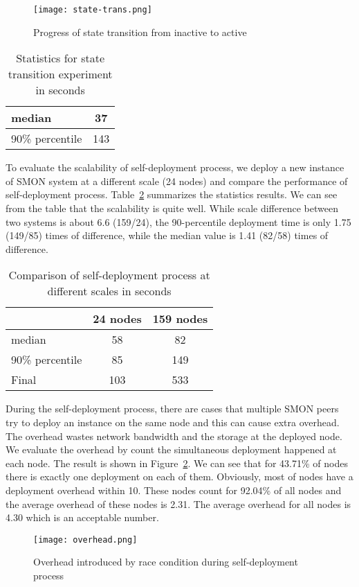 \begin{figure}
\centering
\texttt{[image: state-trans.png]}
\caption{Progress of state transition from inactive to active}
\label{fig:state-transition}
\end{figure}

\begin{table}
\centering
\begin{tabular}{|l|c|}
\hline
median & 37 \\
\hline
90\% percentile & 143 \\
\hline
\end{tabular}
\caption{Statistics for state transition experiment in seconds}
\label{tbl:state-transition}
\end{table}

To evaluate the scalability of self-deployment process, we deploy
a new instance of SMON system at a different scale (24 nodes) and
compare the performance of self-deployment process.
Table~\ref{tbl:scalability} summarizes the statistics results.
We can see from the table that the scalability is quite well.
While scale difference between two systems is about 6.6 (159/24), the
90-percentile deployment time is only 1.75 (149/85) times of
difference, while the median value is 1.41 (82/58) times of
difference.

\begin{table}
\centering
\begin{tabular}{|l|c|c|}
\hline
  & 24 nodes & 159 nodes\\
\hline
median & 58 & 82 \\
\hline
90\% percentile & 85 & 149 \\
\hline
Final & 103 & 533 \\
\hline
\end{tabular}
\caption{Comparison of self-deployment process at different scales in seconds}
\label{tbl:scalability}
\end{table}

During the self-deployment process, there are cases that
multiple SMON peers try to deploy an instance on the same
node and this can cause extra overhead. The overhead wastes
network bandwidth and the storage at the deployed node. We
evaluate the overhead by count the simultaneous deployment
happened at each node. The result is shown in
Figure~\ref{fig:overhead}. We can see that for 43.71\% of
nodes there is exactly one deployment on each of them.
Obviously, most of nodes have a deployment overhead within
10. These nodes count for 92.04\% of all nodes and the
average overhead of these nodes is 2.31. The average
overhead for all nodes is 4.30 which is an acceptable
number. 

\begin{figure}
\centering
\texttt{[image: overhead.png]}
\caption{Overhead introduced by race condition during
self-deployment process}
\label{fig:overhead}
\end{figure}


